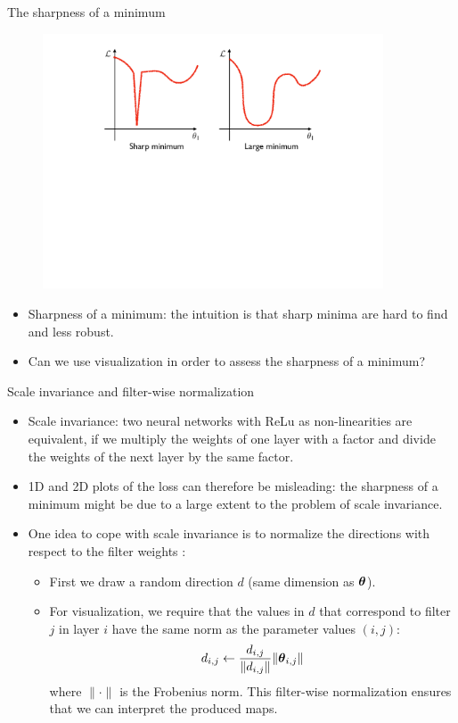 \documentclass[xcolor=pdftex,dvipsnames,table]{beamer}
\begin{document}
\begin{frame}{The sharpness of a minimum}
\begin{figure}[htb]
\includegraphics[width=0.9\textwidth]{../graphics/Vis_sharpness.pdf}
\end{figure}
\begin{itemize}
	\item Sharpness of a minimum: the intuition is that sharp minima are hard to find and less robust. 
	\item Can we use visualization in order to assess the sharpness of a minimum? 
\end{itemize}
\end{frame}

\begin{frame}{Scale invariance and filter-wise normalization}
\begin{itemize}
	\item Scale invariance: two neural networks with ReLu as non-linearities are equivalent, if we multiply the weights of one layer with a factor and divide the weights of the next layer by the same factor. 
	\item 1D and 2D plots of the loss can therefore be misleading: the sharpness of a minimum might be due to a large extent to the problem of scale invariance. 
	\item One idea to cope with scale invariance is to normalize the directions with respect to the filter weights \cite{Li:2018}:
	\begin{itemize}
		\item First we draw a random direction $d$ (same dimension as $\boldsymbol{\theta}$). 
		\item For visualization, we require that the values in $d$ that correspond to filter $j$ in layer $i$ have the same norm as the parameter values $(i,j)$:
		\begin{equation}
			d_{i,j} \leftarrow \frac{d_{i,j}}{\|d_{i,j}\|}\|\boldsymbol{\theta}_{i,j}\|
		\end{equation}
		where $\|\cdot\|$ is the Frobenius norm. This filter-wise normalization ensures that we can interpret the produced maps.
	\end{itemize}
\end{itemize}
\end{frame}
\end{document}
